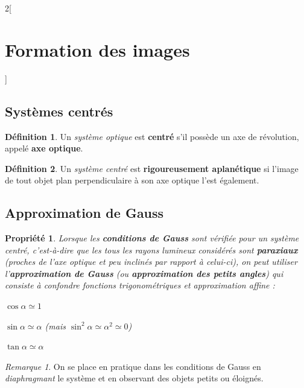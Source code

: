 \documentclass[french]{book}
\newtheorem*{propriete}{Propriété}
\theoremstyle{definition}
\newtheorem*{definition}{Définition}
\theoremstyle{remark}
\newtheorem*{remarque}{Remarque}
\newcommand*{\tdef}[1]{\textbf{#1}}
\newcommand*{\imp}[1]{\emph{#1}}
\begin{document}
\begin{landscape}
\begin{multicols*}{2}[\section{Formation des images}]

\subsection{Systèmes centrés}

\begin{definition}
Un \imp{système optique} est \tdef{centré} s'il possède un axe de révolution, appelé \tdef{axe optique}.
\end{definition}

\begin{definition}
Un \imp{système centré} est \tdef{rigoureusement aplanétique} si l'image de tout objet plan perpendiculaire à son axe optique l'est également.
\end{definition}



\subsection{Approximation de Gauss}

\begin{propriete}
Lorsque les \tdef{conditions de Gauss} sont vérifiée pour un \imp{système centré}, c'est-à-dire que les tous les rayons lumineux considérés sont \tdef{paraxiaux} (proches de l'axe optique et peu inclinés par rapport à celui-ci), on peut utiliser l'\tdef{approximation de Gauss} (ou \tdef{approximation des petits angles}) qui consiste à confondre fonctions trigonométriques et approximation affine :

\begin{center}
\begin{itemize*}[itemjoin=\qquad]
\item $\cos \alpha \simeq 1$
\item $\sin \alpha \simeq \alpha$ (mais $\sin^2 \alpha \simeq \alpha^2 \simeq 0$)
\item $\tan \alpha \simeq \alpha$
\end{itemize*}
\end{center}
\end{propriete}

\begin{remarque}
On se place en pratique dans les conditions de Gauss en \imp{diaphragmant} le système et en observant des objets petits ou éloignés.
\end{remarque}




\end{multicols*}
\end{landscape}
\end{document}
